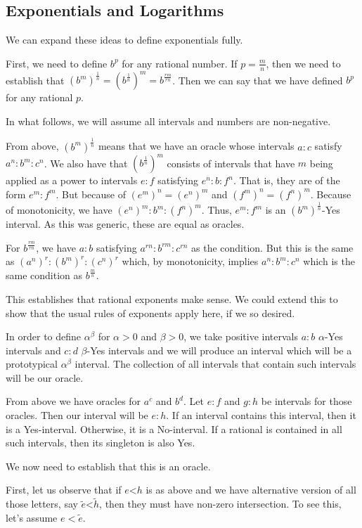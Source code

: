 \documentclass[12pt]{article}
\theoremstyle{remark}
\newcommand{\lt}{\mathord{<}}
\begin{document}
\subsection{Exponentials and Logarithms}

We can expand these ideas to define exponentials fully. 

First, we need to define $b^p$ for any rational number. If $p=\frac{m}{n}$, then we need to establish that $(b^m)^{\frac{1}{n}} = (b^{\frac{1}{n}})^m = b^{\frac{rm}{rn}}$. Then we can say that we have defined $b^p$ for any rational $p$. 

In what follows, we will assume all intervals and numbers are non-negative.

From above, $(b^m)^{\frac{1}{n}}$ means that we have an oracle whose intervals $a:c$ satisfy $a^n : b^m : c^n$. We also have that $(b^{\frac{1}{n}})^m$ consists of intervals that have $m$ being applied as a power to intervals  $e:f$ satisfying $e^n : b : f^n$. That is, they are of the form $e^m:f^m$. But because of $(e^m)^n = (e^n)^m$ and $(f^m)^n = (f^n)^m$. Because of monotonicity, we have $(e^n)^m : b^m : (f^n)^m $. Thus, $e^m:f^m$ is an $(b^m)^{\frac{1}{n}}$-Yes interval. As this was generic, these are equal as oracles. 

For $b^{\frac{rm}{rn}}$, we have $a:b$ satisfying $a^{rn}:b^{rm}:c^{rn}$ as the condition. But this is the same as $(a^n)^r : (b^m)^r : (c^n)^r$ which, by monotonicity, implies $a^n : b^m : c^n$ which is the same condition as $b^{\frac{m}{n}}$.

This establishes that rational exponents make sense. We could extend this to show that the usual rules of exponents apply here, if we so desired. 

In order to define $\alpha^\beta$ for $\alpha > 0$ and $\beta > 0$, we take positive intervals $a:b$ $\alpha$-Yes intervals and $c:d$ $\beta$-Yes intervals and we will produce an interval which will be a prototypical $\alpha^\beta$ interval. The collection of all intervals that contain such intervals will be our oracle. 

From above we have oracles for $a^c$ and $b^d$. Let $e:f$ and $g:h$ be intervals for those oracles. Then our interval will be $e:h$. If an interval contains this interval, then it is a Yes-interval. Otherwise, it is a No-interval. If a rational is contained in all such intervals, then its singleton is also Yes. 

We now need to establish that this is an oracle. 

First, let us observe that if $e \lt h$ is as above and we have alternative version of all those letters, say $\tilde{e} \lt \tilde{h}$, then they must have non-zero intersection. To see this, let's assume $ e < \tilde{e}$. 
\end{document}
